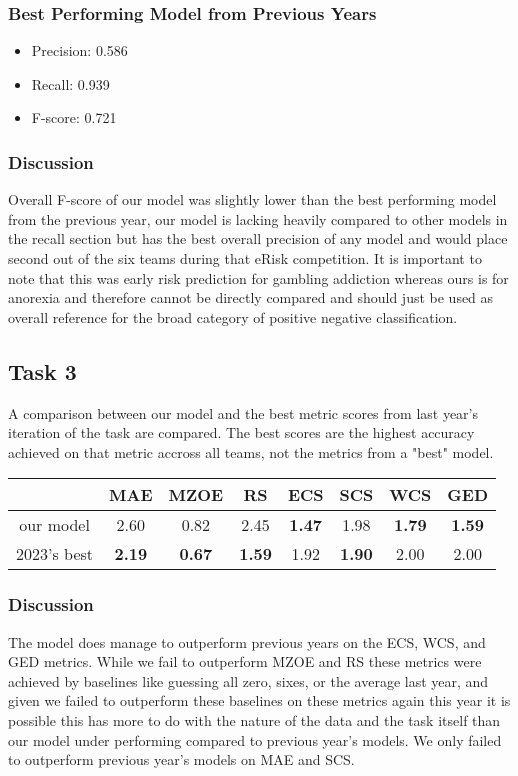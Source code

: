 \documentclass[12pt, titlepage]{article}
\begin{document}
\subsubsection{Best Performing Model from Previous Years}
\begin{itemize}
    \item Precision: 0.586
    \item Recall: 0.939
    \item F-score: 0.721
\end{itemize}

\subsubsection{Discussion}
Overall F-score of our model was slightly lower than the best performing model from the previous year, our model is lacking heavily compared to other models in the recall section but has the best overall precision of any model and would place second out of the six teams during that eRisk competition. It is important to note that this was early risk prediction for gambling addiction whereas ours is for anorexia and therefore cannot be directly compared and should just be used as overall reference for the broad category of positive negative classification.

\subsection{Task 3}
A comparison between our model and the best metric scores from last year's iteration of the task are compared. The best scores are the highest accuracy achieved on that metric accross all teams, not the metrics from a "best" model.

\begin{tabular}{c|ccccccc}
  &  MAE   & MZOE  & RS    & ECS   & SCS   & WCS   & GED \\ \hline
our model  & 2.60  & 0.82  & 2.45  & \textbf{1.47}  & 1.98  & \textbf{1.79}  & \textbf{1.59} \\
2023's best  & \textbf{2.19}  & \textbf{0.67}  & \textbf{1.59}  & 1.92  & \textbf{1.90}  & 2.00  & 2.00 \\
\end{tabular}

\subsubsection{Discussion}
The model does manage to outperform previous years on the ECS, WCS, and GED metrics. While we fail to outperform MZOE and RS these metrics were achieved by baselines like guessing all zero, sixes, or the average last year, and given we failed to outperform these baselines on these metrics again this year it is possible this has more to do with the nature of the data and the task itself than our model under performing compared to previous year's models. We only failed to outperform previous year's models on MAE and SCS.
\end{document}
